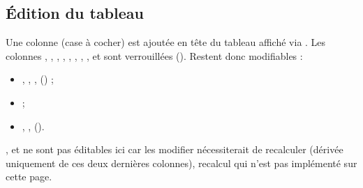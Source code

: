 \documentclass[letterpaper,10pt,english]{sphinxmanual}
\begin{document}
\subsection{Édition du tableau}
\label{\detokenize{5_Management:edition-du-tableau}}
\sphinxAtStartPar
Une colonne  (case à cocher) est ajoutée en tête du tableau affiché via
. Les colonnes , , ,
, , , , ,
 et  sont verrouillées (). Restent donc modifiables :
\begin{itemize}
\item {} 
\sphinxAtStartPar
{}, , ,  () ;

\item {} 
\sphinxAtStartPar
{} ;

\item {} 
\sphinxAtStartPar
{}, ,  ().

\end{itemize}

\sphinxAtStartPar
{},  et  ne sont pas éditables ici car les modifier
nécessiterait de recalculer  (dérivée uniquement de ces deux dernières colonnes),
recalcul qui n’est pas implémenté sur cette page.
\end{document}
